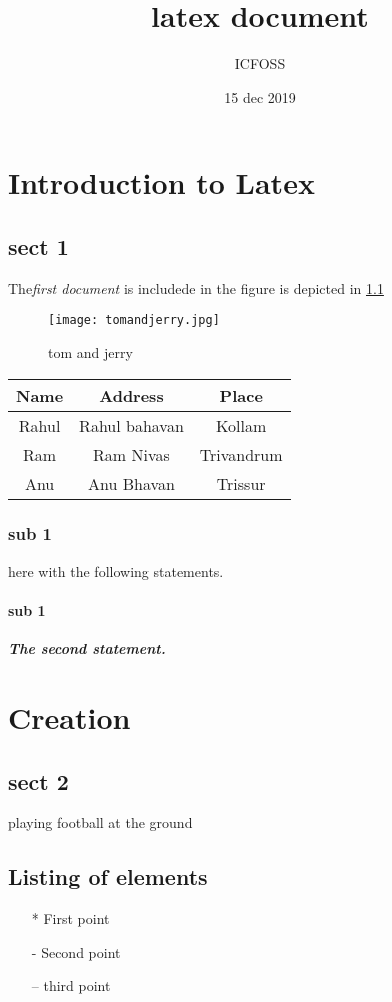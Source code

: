 \documentclass[12pt]{report}
\begin{document}
	
	\title{\textbf{latex document}}
	\author{ICFOSS}
	\date{15 dec 2019 }
	\maketitle
	
	\chapter{Introduction to Latex}
	\section*{sect 1}
	The\textit{first document} is includede in
		the figure is depicted in \ref{f:smile} 
		
	\begin{figure}[H]
	\centering
	\texttt{[image: tomandjerry.jpg]}
	\caption{tom and jerry}	
	\label{f:smile}
		\end{figure}
	\begin{center}
	\begin{tabular}{|c|c|c|}
		\hline
		Name & Address & Place\\
		\hline
		Rahul & Rahul bahavan & Kollam\\
		\hline
		Ram & Ram Nivas & Trivandrum\\
		\hline
		Anu & Anu Bhavan & Trissur\\
		\hline
	\end{tabular}
   \end{center}


	\subsection{sub 1}
	here with the following statements.
\subsubsection{sub 1}
	\textit{\textbf{The second statement.}}
	
	\chapter{Creation}
	\section*{sect 2}
	playing football at the ground
	\section{Listing of elements}
	\begin{itemize}
		\item[*] First point
		\item[-] Second point
		\item[--]third point
	\end{itemize}
\end{document}
